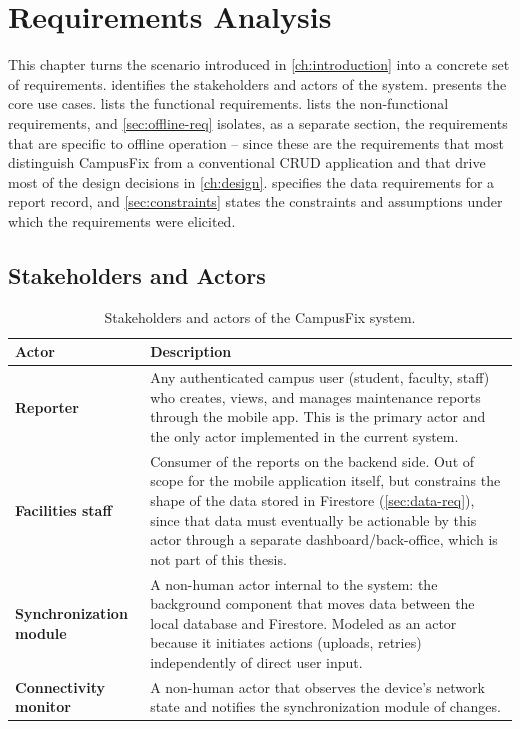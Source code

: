 \chapter{Requirements Analysis}
\label{ch:requirements}

This chapter turns the scenario introduced in \cref{ch:introduction} into a
concrete set of requirements.  identifies the
stakeholders and actors of the system.  presents the
core use cases.  lists the functional
requirements.  lists the non-functional
requirements, and \cref{sec:offline-req} isolates, as a separate section,
the requirements that are specific to offline operation -- since these are
the requirements that most distinguish CampusFix from a conventional CRUD
application and that drive most of the design decisions in
\cref{ch:design}.  specifies the data requirements for a
report record, and \cref{sec:constraints} states the constraints and
assumptions under which the requirements were elicited.

\section{Stakeholders and Actors}
\label{sec:stakeholders}

\begin{table}[htbp]
\centering
\caption{Stakeholders and actors of the CampusFix system.}
\label{tab:stakeholders}
\begin{tabularx}{\textwidth}{@{}l X@{}}
\toprule
\textbf{Actor} & \textbf{Description} \\
\midrule
\textbf{Reporter} & Any authenticated campus user (student, faculty, staff)
who creates, views, and manages maintenance reports through the mobile
app. This is the primary actor and the only actor implemented in the
current system. \\
\textbf{Facilities staff} & Consumer of the reports on the backend side.
Out of scope for the mobile application itself, but constrains the shape
of the data stored in Firestore (\cref{sec:data-req}), since that data must
eventually be actionable by this actor through a separate
dashboard/back-office, which is not part of this thesis. \\
\textbf{Synchronization module} & A non-human actor internal to the
system: the background component that moves data between the local
database and Firestore. Modeled as an actor because it initiates actions
(uploads, retries) independently of direct user input. \\
\textbf{Connectivity monitor} & A non-human actor that observes the
device's network state and notifies the synchronization module of
changes. \\
\bottomrule
\end{tabularx}
\end{table}

